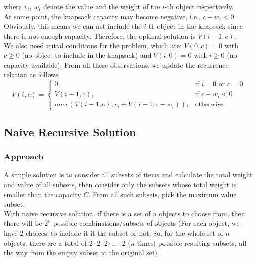 \documentclass{article}
\begin{document}
where $v_i$, $w_i$ denote the value and the weight of the $i$-th object respectively. \\
\indent At some point, the knapsack capacity may become negative, i.e., $c - w_i < 0$. Obviously, this means we can not include the $i$-th object in the knapsack since there is not enough capacity. Therefore, the optimal solution is $V(i-1, c)$. \\
\indent We also need initial conditions for the problem, which are: $V(0, c) = 0$ with $c \geq 0$ (no object to include in the knapsack) and $V(i, 0) = 0$ with $i \geq 0$ (no capacity available). 
From all those observations, we update the recurrence relation as follows:
\begin{equation}
   V(i, c)=
    \begin{cases}
      0, & \text{if $i = 0$ or $c = 0$}\\
      V(i-1, c), & \text{if $c-w_i < 0$}\\
      max(V(i-1, c), v_i + V(i-1, c-w_i)), & \text{otherwise}
    \end{cases}  
    \label{Eq.2}
\end{equation}

\subsection{Naive Recursive Solution}
\subsubsection{Approach}
A simple solution is to consider all subsets of items and calculate the total weight and value of all subsets, then consider only the subsets whose total weight is smaller than the capacity $C$. From all such subsets, pick the maximum value subset. \\
\indent With naive recursive solution, if there is a set of $n$ objects to choose from, then there will be $2^n$ possible combinations/subsets of objects (For each object, we have 2 choices: to include it it the subset or not. So, for the whole set of $n$ objects, there are a total of $2 \cdot 2 \cdot 2 \cdot ... \cdot 2$ ($n$ times) possible resulting subsets, all the way from the empty subset to the original set). 
\end{document}
